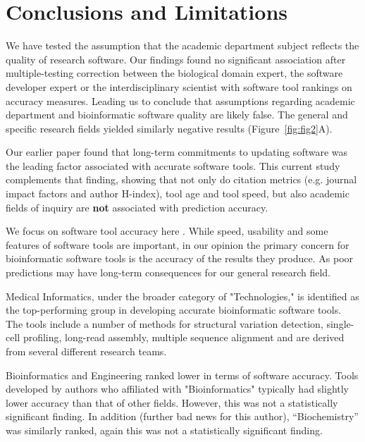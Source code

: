 \documentclass[fleqn,10pt,doc,onecolumn]{SelfArx}%
\begin{document}

\section*{Conclusions and Limitations}

We have tested the assumption that the academic department subject
reflects the quality of research software. Our findings found no
significant association after multiple-testing correction between the
biological domain expert, the software developer expert or the
interdisciplinary scientist with software tool rankings on accuracy
measures. Leading us to conclude that assumptions regarding academic
department and bioinformatic software quality are likely false. The
general and specific research fields yielded similarly negative
results (Figure~\ref{fig:fig2}A).

Our earlier paper found that long-term commitments to updating
software was the leading factor associated with accurate software
tools. This current study complements that finding, showing that not
only do citation metrics (e.g. journal impact factors and author
H-index), tool age and tool speed, but also academic fields of inquiry
are \textbf{not} associated with prediction accuracy.

We focus on software tool accuracy here \cite{weber2019essential}. While speed, usability and
some features of software tools are important, in our opinion the
primary concern for bioinformatic software tools is the accuracy of
the results they produce. As poor predictions may have long-term consequences for
our general research field. 

Medical Informatics, under the broader category of "Technologies," is
identified as the top-performing group in developing accurate
bioinformatic software tools. The tools include a number of methods
for structural variation detection, single-cell profiling, long-read
assembly, multiple sequence alignment and are derived from several
different research teams. 

Bioinformatics and Engineering ranked lower in terms of software
accuracy. Tools developed by authors who affiliated with
"Bioinformatics" typically had slightly lower accuracy than that of
other fields. However, this was not a statistically significant
finding. In addition (further bad news for this author),
``Biochemistry'' was similarly ranked, again this was not a
statistically significant finding.
\end{document}
